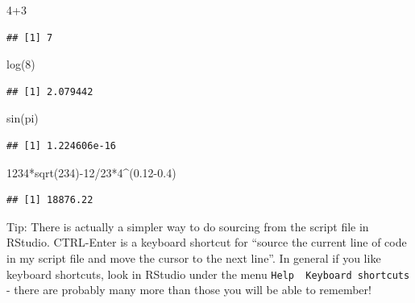 \documentclass[
]{article}
\newenvironment{Shaded}{\begin{snugshade}}{\end{snugshade}}
\newcommand{\DecValTok}[1]{\textcolor[rgb]{0.00,0.00,0.81}{#1}}
\newcommand{\FloatTok}[1]{\textcolor[rgb]{0.00,0.00,0.81}{#1}}
\newcommand{\FunctionTok}[1]{\textcolor[rgb]{0.00,0.00,0.00}{#1}}
\newcommand{\NormalTok}[1]{#1}
\newcommand{\SpecialCharTok}[1]{\textcolor[rgb]{0.00,0.00,0.00}{#1}}
\begin{document}
\begin{Shaded}
\begin{Highlighting}[]
\DecValTok{4}\SpecialCharTok{+}\DecValTok{3}
\end{Highlighting}
\end{Shaded}

\begin{verbatim}
## [1] 7
\end{verbatim}

\begin{Shaded}
\begin{Highlighting}[]
\FunctionTok{log}\NormalTok{(}\DecValTok{8}\NormalTok{)}
\end{Highlighting}
\end{Shaded}

\begin{verbatim}
## [1] 2.079442
\end{verbatim}

\begin{Shaded}
\begin{Highlighting}[]
\FunctionTok{sin}\NormalTok{(pi)}
\end{Highlighting}
\end{Shaded}

\begin{verbatim}
## [1] 1.224606e-16
\end{verbatim}

\begin{Shaded}
\begin{Highlighting}[]
\DecValTok{1234}\SpecialCharTok{*}\FunctionTok{sqrt}\NormalTok{(}\DecValTok{234}\NormalTok{)}\SpecialCharTok{{-}}\DecValTok{12}\SpecialCharTok{/}\DecValTok{23}\SpecialCharTok{*}\DecValTok{4}\SpecialCharTok{\^{}}\NormalTok{(}\FloatTok{0.12{-}0.4}\NormalTok{)}
\end{Highlighting}
\end{Shaded}

\begin{verbatim}
## [1] 18876.22
\end{verbatim}

Tip: There is actually a simpler way to do sourcing from the script file
in RStudio. CTRL-Enter is a keyboard shortcut for ``source the current
line of code in my script file and move the cursor to the next line''.
In general if you like keyboard shortcuts, look in RStudio under the
menu \texttt{Help\ \textbar{}\ Keyboard\ shortcuts} - there are probably
many more than those you will be able to remember!
\end{document}
